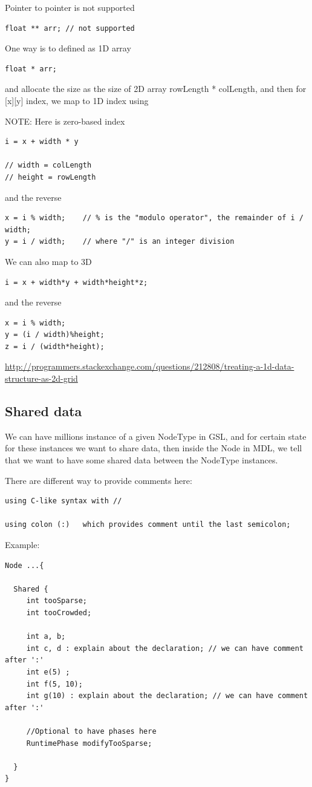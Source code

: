 Pointer to pointer is not supported
\begin{verbatim}
float ** arr; // not supported
\end{verbatim}

One way is to defined as 1D array
\begin{verbatim}
float * arr; 
\end{verbatim}
and allocate the size as the size of 2D array rowLength * colLength, and then
for [x][y] index, we map to 1D index using

NOTE: Here is zero-based index
\begin{verbatim}
i = x + width * y

// width = colLength
// height = rowLength
\end{verbatim}
and the reverse
\begin{verbatim}
x = i % width;    // % is the "modulo operator", the remainder of i / width;
y = i / width;    // where "/" is an integer division
\end{verbatim}

We can also map to 3D
\begin{verbatim}
i = x + width*y + width*height*z;
\end{verbatim}
and the reverse
\begin{verbatim}
x = i % width;
y = (i / width)%height;
z = i / (width*height);
\end{verbatim}


\url{http://programmers.stackexchange.com/questions/212808/treating-a-1d-data-structure-as-2d-grid}


\subsection{Shared data}
\label{sec:MDL-shared}

We can have millions instance of a given NodeType in GSL, and for certain state
for these instances we want to share data, then inside the Node in MDL, we tell
that we want to have some shared data between the NodeType instances.

There are different way to provide comments here: 
\begin{verbatim}
using C-like syntax with //

using colon (:)   which provides comment until the last semicolon;

\end{verbatim}


Example:
\begin{verbatim}
Node ...{

  Shared {
     int tooSparse;
     int tooCrowded;
     
     int a, b;
     int c, d : explain about the declaration; // we can have comment after ':' 
     int e(5) ;   
     int f(5, 10); 
     int g(10) : explain about the declaration; // we can have comment after ':' 
     
     //Optional to have phases here
     RuntimePhase modifyTooSparse; 
     
  }
}
\end{verbatim}

